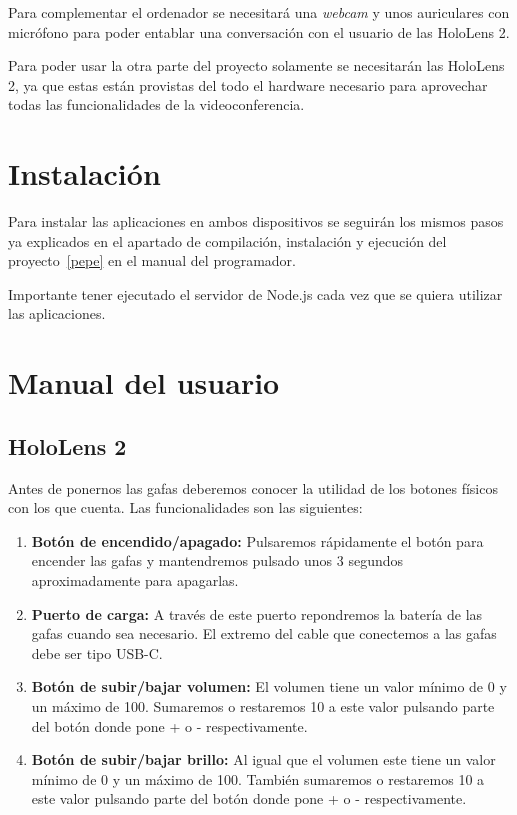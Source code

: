 Para complementar el ordenador se necesitará una \textit{webcam} y unos auriculares con micrófono para poder entablar una conversación con el usuario de las HoloLens 2.

Para poder usar la otra parte del proyecto solamente se necesitarán las HoloLens 2, ya que estas están provistas del todo el hardware necesario para aprovechar todas las funcionalidades de la videoconferencia.

\section{Instalación}

Para instalar las aplicaciones en ambos dispositivos se seguirán los mismos pasos ya explicados en el apartado de compilación, instalación y ejecución del proyecto~\ref{pepe} en el manual del programador. 

Importante tener ejecutado el servidor de Node.js cada vez que se quiera utilizar las aplicaciones.


\section{Manual del usuario}

\subsection{HoloLens 2}

Antes de ponernos las gafas deberemos conocer la utilidad de los botones físicos con los que cuenta. Las funcionalidades son las siguientes:
\begin{enumerate}
    \item \textbf{Botón de encendido/apagado: }Pulsaremos rápidamente el botón para encender las gafas y mantendremos pulsado unos 3 segundos aproximadamente para apagarlas. 
    \item \textbf{Puerto de carga: }A través de este puerto repondremos la batería de las gafas cuando sea necesario. El extremo del cable que conectemos a las gafas debe ser tipo USB-C.
    \item \textbf{Botón de subir/bajar volumen: }El volumen tiene un valor mínimo de 0 y un máximo de 100. Sumaremos o restaremos 10 a este valor pulsando parte del botón donde pone + o - respectivamente.
    \item \textbf{Botón de subir/bajar brillo: }Al igual que el volumen este tiene un valor mínimo de 0 y un máximo de 100. También sumaremos o restaremos 10 a este valor pulsando parte del botón donde pone + o - respectivamente.
\end{enumerate}



